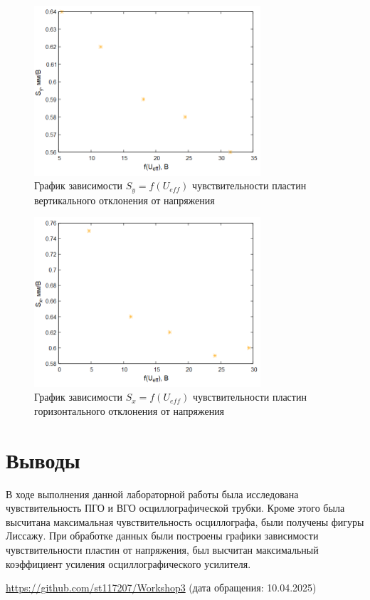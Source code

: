 \begin{figure}[H]
\centering
\includegraphics[width=0.75\textwidth]{График 1.png}
\caption{График зависимости $S_y=f(U_{eff})$ чувствительности пластин вертикального отклонения от напряжения}
\label{fig:graph1}
\end{figure}
\begin{figure}[H]
\centering
\includegraphics[width=0.75\textwidth]{График 2.png}
\caption{График зависимости $S_x=f(U_{eff})$ чувствительности пластин горизонтального отклонения от напряжения}
\label{fig:graph2}
\end{figure}




\section{Выводы}
В ходе выполнения данной лабораторной работы была исследована чувствительность ПГО и ВГО осциллографической трубки. Кроме этого была высчитана максимальная чувствительность осциллографа, были получены фигуры Лиссажу. При обработке данных были построены графики зависимости чувствительности пластин от напряжения, был высчитан максимальный коэффициент усиления осциллографического усилителя.


\begin{thebibliography}{9}

\url{https://github.com/st117207/Workshop3}  (дата обращения: 10.04.2025) 


\end{thebibliography}

